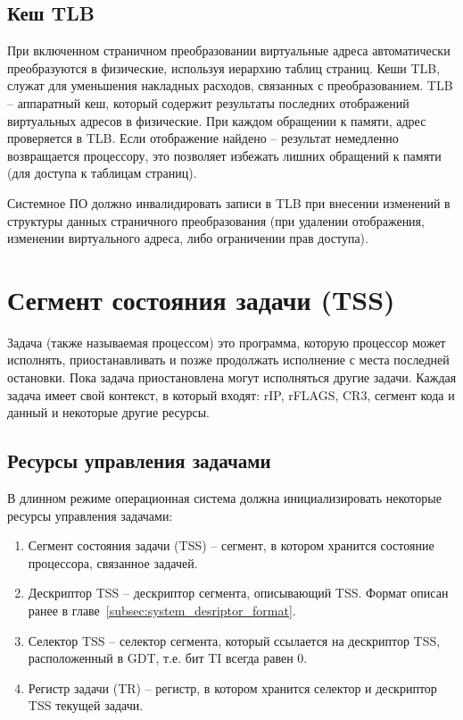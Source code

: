 \subsection{Кеш TLB}
При включенном страничном преобразовании виртуальные адреса автоматически преобразуются в физические,
используя иерархию таблиц страниц. Кеши TLB, служат для уменьшения накладных расходов, связанных с преобразованием.
TLB -- аппаратный кеш, который содержит результаты последних отображений виртуальных адресов в физические.
При каждом обращении к памяти, адрес проверяется в TLB. Если отображение найдено -- результат немедленно возвращается
процессору, это позволяет избежать лишних обращений к памяти (для доступа к таблицам страниц).

Системное ПО должно инвалидировать записи в TLB при внесении изменений в структуры данных страничного
преобразования (при удалении отображения, изменении виртуального адреса, либо ограничении прав доступа).


\section{Сегмент состояния задачи (TSS)}
\label{sec:task_state}

Задача (также называемая процессом) это программа, которую процессор может
исполнять, приостанавливать и позже продолжать исполнение с места последней
остановки. Пока задача приостановлена могут исполняться другие задачи. Каждая
задача имеет свой контекст, в который входят: rIP, rFLAGS, CR3, сегмент кода
и данный и некоторые другие ресурсы.

\subsection{Ресурсы управления задачами}
В длинном режиме операционная система должна инициализировать некоторые ресурсы
управления задачами:
\begin{enumerate}[1.]
\item Сегмент состояния задачи (TSS) -- сегмент, в котором хранится состояние
	процессора, связанное задачей.
\item Дескриптор TSS -- дескриптор сегмента, описывающий TSS. Формат описан ранее в
	главе~\ref{subsec:system_desriptor_format}.
\item Селектор TSS -- селектор сегмента, который ссылается на дескриптор TSS,
	расположенный в GDT, т.е. бит TI всегда равен 0.
\item Регистр задачи (TR) -- регистр, в котором хранится селектор и дескриптор
	TSS текущей задачи.
\end{enumerate}


